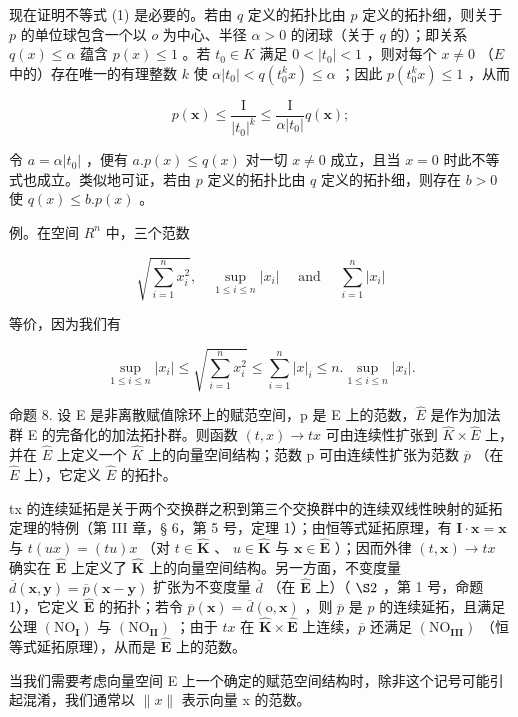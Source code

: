 现在证明不等式 (1) 是必要的。若由 \(q\) 定义的拓扑比由 \(p\) 定义的拓扑细，则关于 \(p\) 的单位球包含一个以 \(o\) 为中心、半径 \(\alpha > 0\) 的闭球（关于 \(q\) 的）；即关系 \(q(x) \leqslant \alpha\) 蕴含 \(p(x) \leqslant 1\) 。若 \(t_0 \in K\) 满足 \(0 < |t_0| < 1\) ，则对每个 \(x \neq 0\) （\(E\) 中的）存在唯一的有理整数 \(k\) 使 \(\alpha |t_0| < q(t_0^k x) \leqslant \alpha\) ；因此 \(p(t_0^k x) \leqslant 1\) ，从而

\[
p (\boldsymbol {x}) \leqslant \frac {\mathrm{I}}{\left| t _ {0} \right| ^ {k}} \leqslant \frac {\mathrm{I}}{\alpha \left| t _ {0} \right|} q (\boldsymbol {x});
\]

令 \(a = \alpha |t_0|\) ，便有 \(a.p(x) \leqslant q(x)\) 对一切 \(x \neq 0\) 成立，且当 \(x = 0\) 时此不等式也成立。类似地可证，若由 \(p\) 定义的拓扑比由 \(q\) 定义的拓扑细，则存在 \(b > 0\) 使 \(q(x) \leqslant b.p(x)\) 。

例。在空间 \(R^{n}\) 中，三个范数

\[
\sqrt {\sum_ {i = 1} ^ {n} x _ {i} ^ {2}}, \quad \sup _ {1 \leqslant i \leqslant n} | x _ {i} | \quad \text { and } \quad \sum_ {i = 1} ^ {n} | x _ {i} |
\]

等价，因为我们有

\[
\sup _ {1 \leqslant i \leqslant n} | x _ {i} | \leqslant \sqrt {\sum_ {i = 1} ^ {n} x _ {i} ^ {2}} \leqslant \sum_ {i = 1} ^ {n} | x | _ {i} \leqslant n. \sup _ {1 \leqslant i \leqslant n} | x _ {i} |.\tag{2}
\]

命题 8. 设 E 是非离散赋值除环上的赋范空间，p 是 E 上的范数，\(\hat{E}\) 是作为加法群 E 的完备化的加法拓扑群。则函数 \((t, x) \to tx\) 可由连续性扩张到 \(\hat{K} \times \hat{E}\) 上，并在 \(\hat{E}\) 上定义一个 \(\hat{K}\) 上的向量空间结构；范数 p 可由连续性扩张为范数 \(\overline{p}\) （在 \(\hat{E}\) 上），它定义 \(\hat{E}\) 的拓扑。

tx 的连续延拓是关于两个交换群之积到第三个交换群中的连续双线性映射的延拓定理的特例（第 III 章，§ 6，第 5 号，定理 1）；由恒等式延拓原理，有 \(\mathbf{I} \cdot \mathbf{x} = \mathbf{x}\) 与 \(t(ux) = (tu)x\) （对 \(t \in \hat{\mathbf{K}}\) 、 \(u \in \hat{\mathbf{K}}\) 与 \(\mathbf{x} \in \hat{\mathbf{E}}\) ）；因而外律 \((t, \mathbf{x}) \to tx\) 确实在 \(\hat{\mathbf{E}}\) 上定义了 \(\hat{\mathbf{K}}\) 上的向量空间结构。另一方面，不变度量 \(\overline{d}(\mathbf{x}, \mathbf{y}) = \overline{p}(\mathbf{x} - \mathbf{y})\) 扩张为不变度量 \(\overline{d}\) （在 \(\hat{\mathbf{E}}\) 上）（ \(\S 2\) ，第 1 号，命题 1），它定义 \(\hat{\mathbf{E}}\) 的拓扑；若令 \(\overline{p}(\mathbf{x}) = \overline{d}(\mathrm{o}, \mathbf{x})\) ，则 \(\overline{p}\) 是 \(p\) 的连续延拓，且满足公理 \((\mathrm{NO}_{\mathbf{I}})\) 与 \((\mathrm{NO}_{\mathbf{II}})\) ；由于 \(tx\) 在 \(\hat{\mathbf{K}} \times \hat{\mathbf{E}}\) 上连续，\(\overline{p}\) 还满足 \((\mathrm{NO}_{\mathbf{III}})\) （恒等式延拓原理），从而是 \(\hat{\mathbf{E}}\) 上的范数。

当我们需要考虑向量空间 E 上一个确定的赋范空间结构时，除非这个记号可能引起混淆，我们通常以 \(\|x\|\) 表示向量 x 的范数。

